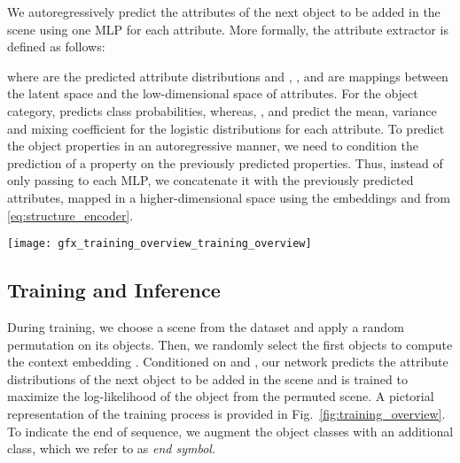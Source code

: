 \documentclass{article}
\newcommand{\boldparagraph}[1]{\vspace{0.2cm}\noindent{\bf #1:} }
\newcommand{\figref}[1]{Fig.~\ref{#1}}
\begin{document}
\vspace{-2mm}
\boldparagraph{Attribute Extractor}We autoregressively predict the attributes
of the next object to be added in the scene using one MLP for each attribute.
More formally, the attribute extractor is defined as follows:

where  are the predicted
attribute distributions and , ,  and  are mappings between the latent space and the low-dimensional space of attributes.
For the object category,  predicts  class probabilities, whereas,
,  and  predict the mean, variance and
mixing coefficient for the  logistic distributions for each attribute.
To predict the object properties in an autoregressive manner, we need to
condition the prediction of a property on the previously predicted properties.
Thus, instead of only passing  to each MLP, we concatenate it with
the previously predicted attributes, mapped in a
higher-dimensional space using the embeddings
 and  from \eqref{eq:structure_encoder}.

\begin{figure*}
    \centering
    \texttt{[image: gfx\_training\_overview\_training\_overview]}
    \caption{\small
        \textbf{Training Overview:} Given a scene with  objects (coloured
        squares), we first randomly permute them and then keep the first 
        objects (here ). We task our network to predict
        the next object to be added in the scene given the subset of kept objects
        (highlighted with grey) and its floor layout feature
        . Our loss function is the negative log-likelihood
        (NLL) of the next object in the permuted sequence (green square).
    }
    \label{fig:training_overview}
    \vspace{-1.2em}
\end{figure*}



\vspace{-2mm}
\subsection{Training and Inference}\label{subsec:training_inference}

During training, we choose a scene from the dataset and apply a random
permutation  on its  objects. Then, we randomly select the first
 objects to compute the context embedding . Conditioned on  and
, our network predicts the attribute distributions of the
next object to be added in the scene and is trained to maximize the
log-likelihood of the  object from the permuted scene. A pictorial
representation of the training process is provided in
\figref{fig:training_overview}. To indicate the end of sequence, we
augment the  object classes with an additional class, which we refer to as
\emph{end symbol}.
\end{document}
